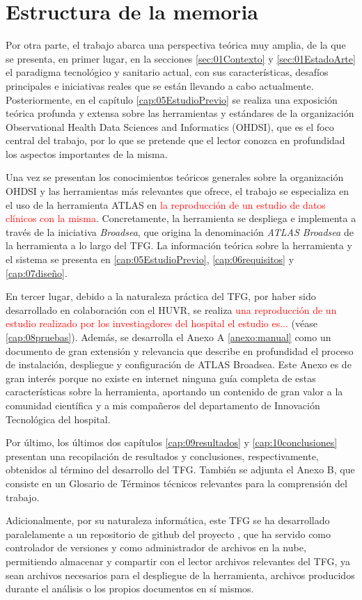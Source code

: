 \section{Estructura de la memoria} \label{sec:01Intro}


Por otra parte, el trabajo abarca una perspectiva teórica muy amplia, de la que se presenta, en primer lugar, en la secciones \ref{sec:01Contexto} y \ref{sec:01EstadoArte} el paradigma tecnológico y sanitario actual, con sus características, desafíos principales e iniciativas reales que se están llevando a cabo actualmente. Posteriormente, en el capítulo \ref{cap:05EstudioPrevio} se realiza una exposición teórica profunda y extensa sobre las herramientas y estándares de la organización Observational Health Data Sciences and Informatics (OHDSI), que es el foco central del trabajo, por lo que se pretende que el lector conozca en profundidad los aspectos importantes de la misma.

Una vez se presentan los conocimientos teóricos generales sobre la organización OHDSI y las herramientas más relevantes que ofrece, el trabajo se especializa en el uso de la herramienta ATLAS en \textcolor{red}{la reproducción de un estudio de datos clínicos con la misma}. Concretamente, la herramienta se despliega e implementa a través de la iniciativa \textit{Broadsea}, que origina la denominación \textit{ATLAS Broadsea} de la herramienta a lo largo del TFG. La información teórica sobre la herramienta y el sistema se presenta en \ref{cap:05EstudioPrevio}, \ref{cap:06requisitos} y \ref{cap:07diseño}.

En tercer lugar, debido a la naturaleza práctica del TFG, por haber sido desarrollado en colaboración con el HUVR, se realiza \textcolor{red}{una reproducción de un estudio realizado por los investiagdores del hospital el estudio es...} (véase \ref{cap:08pruebas}). Además, se desarrolla el Anexo A \ref{anexo:manual} como un documento de gran extensión y relevancia que describe en profundidad el proceso de instalación, despliegue y configuración de ATLAS Broadsea. Este Anexo es de gran interés porque no existe en internet ninguna guía completa de estas características sobre la herramienta, aportando un contenido de gran valor a la comunidad científica y a mis compañeros del departamento de Innovación Tecnológica del hospital.

Por último, los últimos dos capítulos \ref{cap:09resultados} y \ref{cap:10conclusiones} presentan una recopilación de resultados y conclusiones, respectivamente, obtenidos al término del desarrollo del TFG. También se adjunta el Anexo B, que consiste en un Glosario de Términos técnicos relevantes para la comprensión del trabajo. 

Adicionalmente, por su naturaleza informática, este TFG se ha desarrollado paralelamente a un repositorio de github del proyecto \cite{vallealonsodc}, que ha servido como controlador de versiones y como administrador de archivos en la nube, permitiendo almacenar y compartir con el lector archivos relevantes del TFG, ya sean archivos necesarios para el despliegue de la herramienta, archivos producidos durante el análisis o los propios documentos en sí mismos.
